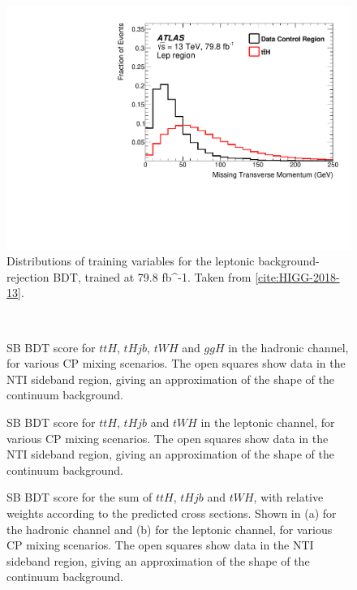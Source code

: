 \begin{figure}
	\includegraphics[width=0.31\linewidth]{figures/tthcp_chapter/figaux_11g.pdf}
	\caption{Distributions of training variables for the leptonic background-rejection BDT, trained at 79.8 fb^{-1}. Taken from \ref{cite:HIGG-2018-13}.}
	\label{fig:SBBDTvarslep}
\end{figure}

\ifffalse
\begin{figure}[htbp]
  \centering
         \\
  \caption{SB BDT score for $ttH$, $tHjb$, $tWH$ and $ggH$ in the hadronic channel, for various CP mixing scenarios. The open squares show data in the NTI sideband region, giving an approximation of the shape of the continuum background.  }
  \label{fig:moriondhad}
\end{figure}

\begin{figure}[htbp]
  \centering
  \caption{SB BDT score for $ttH$, $tHjb$ and $tWH$ in the leptonic channel, for various CP mixing scenarios. The open squares show data in the NTI sideband region, giving an approximation of the shape of the continuum background.  }
  \label{fig:moriondlep}
\end{figure}
\fi

\begin{figure}[htbp]
  \centering
  \caption{SB BDT score for the sum of $ttH$, $tHjb$ and $tWH$, with relative weights according to the predicted cross sections. Shown in (a) for the hadronic channel and (b) for the leptonic channel, for various CP mixing scenarios. The open squares show data in the NTI sideband region, giving an approximation of the shape of the continuum background.  }
  \label{fig:moriondtotal}
\end{figure}


